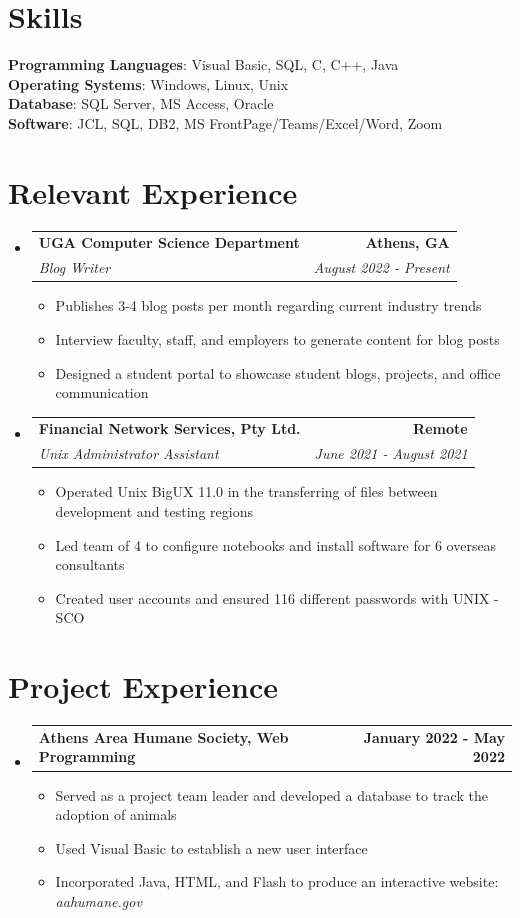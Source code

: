 \documentclass[letterpaper,11pt]{article}
\makeatletter
\newcommand{\resumeItem}[1]{
  \item\small{
    {#1 \vspace{-2pt}}
  }
}
\newcommand{\resumeSubheading}[4]{
  \vspace{-2pt}\item
    \begin{tabular*}{1.0\textwidth}[t]{l@{\extracolsep{\fill}}r}
      \textbf{#1} & \textbf{\small #2} \\
      \textit{\small#3} & \textit{\small #4} \\
    \end{tabular*}\vspace{-7pt}
}
\newcommand{\resumeProjectHeading}[2]{
    \item
    \begin{tabular*}{1.001\textwidth}{l@{\extracolsep{\fill}}r}
      \small#1 & \textbf{\small #2}\\
    \end{tabular*}\vspace{-7pt}
}
\newcommand{\resumeSubHeadingListStart}{\begin{itemize}[leftmargin=0.0in, label={}]}
\newcommand{\resumeSubHeadingListEnd}{\end{itemize}}
\newcommand{\resumeItemListStart}{\begin{itemize}}
\newcommand{\resumeItemListEnd}{\end{itemize}\vspace{-5pt}}
\makeatother
\begin{document}
\section{Skills}
 \begin{itemize}[leftmargin=0.15in, label={}]
    \small{\item{
     \textbf{Programming Languages}{: Visual Basic, SQL, C, C++, Java} \\
     \textbf{Operating Systems}{: Windows, Linux, Unix} \\
     \textbf{Database}{: SQL Server, MS Access, Oracle} \\
     \textbf{Software}{: JCL, SQL, DB2, MS FrontPage/Teams/Excel/Word, Zoom}
    }}
 \end{itemize}
 \vspace{-16pt}

\section{Relevant Experience}
  \resumeSubHeadingListStart

    \resumeSubheading
      {UGA Computer Science Department}{Athens, GA}
      {Blog Writer}{August 2022 - Present}
      \resumeItemListStart
        \resumeItem{Publishes 3-4 blog posts per month regarding current industry trends}
        \resumeItem{Interview faculty, staff, and employers to generate content for blog posts}
        \resumeItem{Designed a student portal to showcase student blogs, projects, and office communication}
      \resumeItemListEnd

    \resumeSubheading
      {Financial Network Services, Pty Ltd.}{Remote}
      {Unix Administrator Assistant}{June 2021 - August 2021}
      \resumeItemListStart
        \resumeItem{Operated Unix BigUX 11.0 in the transferring of files between development and testing regions}
        \resumeItem{Led team of 4 to configure notebooks and install software for 6 overseas consultants}
        \resumeItem{Created user accounts and ensured 116 different passwords with UNIX - SCO}
      \resumeItemListEnd

  \resumeSubHeadingListEnd
\vspace{-16pt}

\section{Project Experience}
    \resumeSubHeadingListStart
      \resumeProjectHeading
          {\textbf{Athens Area Humane Society, Web Programming}}{January 2022 - May 2022}
          \resumeItemListStart
            \resumeItem{Served as a project team leader and developed a database to track the adoption of animals}
            \resumeItem{Used Visual Basic to establish a new user interface}
            \resumeItem{Incorporated Java, HTML, and Flash to produce an interactive website: \textit{aahumane.gov}}
          \resumeItemListEnd
          \vspace{-13pt}
    \resumeSubHeadingListEnd
\end{document}
